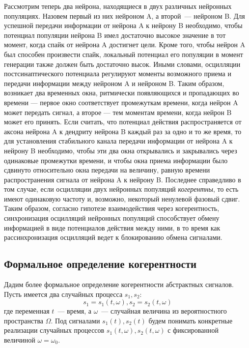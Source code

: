 Рассмотрим теперь
два нейрона, находящиеся в двух различных нейронных популяциях. Назовем первый
из них нейроном A, а второй~--- нейроном B.  Для успешной передачи информации
от нейрона A к нейрону B необходимо, чтобы потенциал популяции нейрона B имел
достаточно высокое значение в тот момент, когда спайк от нейрона A достигнет
цели. Кроме того, чтобы нейрон A был способен произвести спайк, локальный
потенциал его популяции в момент генерации также должен быть достаточно высок.
Иными словами, осцилляции постсинаптического потенциала регулируют моменты
возможного приема и передачи информации между нейроном A и нейроном B. Таким
образом, возникает два временных окна, ритмически появляющихся и пропадающих во
времени --- первое окно соответствует промежуткам времени, когда нейрон A может
передать сигнал, а второе --- тем моментам времени, когда нейрон B может его
принять.  Если считать, что потенциал действия распространяется от аксона
нейрона A к дендриту нейрона B каждый раз за одно и то же время, то для
установления стабильного канала передачи информации от нейрона A к нейрону B
необходимо, чтобы эти два окна открывались и закрывались через одинаковые
промежутки времени, и чтобы окна приема информации было сдвинуто относительно
окна передачи на величину, равную времени распространения сигнала от нейрона A
к нейрону B.  Последнее справедливо в том случае, если осцилляции двух
нейронных популяций \emph{когерентны}, то есть имеют одинаковую частоту и,
возможно, некоторый ненулевой фазовый сдвиг.  Таким образом, согласно гипотезе
взаимодействия через когерентность, синхронизация осцилляций нейронных
популяций способствует обмену информацией в виде потенциалов действия между
ними, в то время как рассинхронизация осцилляций ведет к блокированию обмена
сигналами.


\subsection{Формальное определение когерентности}
Дадим более формальное определение когерентности абстрактных сигналов.
Пусть имеется два случайных процесса $s_1, s_2$:
\begin{equation}
    s_1 = s_1(t,\omega), s_2 = s_2(t,\omega)
\end{equation}
где переменная $t$~--- время, а $\omega$~--- случайная величина из
вероятностного пространства $\Omega$.  Под сигналами $s_1(t), s_2(t)$ будем
понимать конкретные реализации случайных процессов $s_1(t,\omega),
s_2(t,\omega)$ с фиксированной величиной $\omega = \omega_0$.

